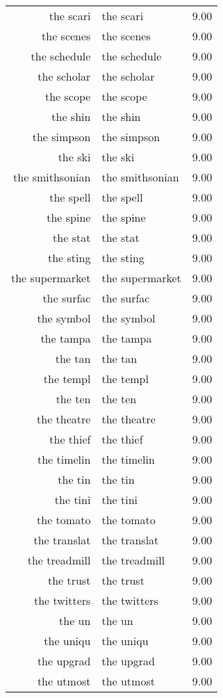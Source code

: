 \begin{table}[ht]
\begin{tabular}{rlr}
  the scari & the scari & 9.00 \\ 
  the scenes & the scenes & 9.00 \\ 
  the schedule & the schedule & 9.00 \\ 
  the scholar & the scholar & 9.00 \\ 
  the scope & the scope & 9.00 \\ 
  the shin & the shin & 9.00 \\ 
  the simpson & the simpson & 9.00 \\ 
  the ski & the ski & 9.00 \\ 
  the smithsonian & the smithsonian & 9.00 \\ 
  the spell & the spell & 9.00 \\ 
  the spine & the spine & 9.00 \\ 
  the stat & the stat & 9.00 \\ 
  the sting & the sting & 9.00 \\ 
  the supermarket & the supermarket & 9.00 \\ 
  the surfac & the surfac & 9.00 \\ 
  the symbol & the symbol & 9.00 \\ 
  the tampa & the tampa & 9.00 \\ 
  the tan & the tan & 9.00 \\ 
  the templ & the templ & 9.00 \\ 
  the ten & the ten & 9.00 \\ 
  the theatre & the theatre & 9.00 \\ 
  the thief & the thief & 9.00 \\ 
  the timelin & the timelin & 9.00 \\ 
  the tin & the tin & 9.00 \\ 
  the tini & the tini & 9.00 \\ 
  the tomato & the tomato & 9.00 \\ 
  the translat & the translat & 9.00 \\ 
  the treadmill & the treadmill & 9.00 \\ 
  the trust & the trust & 9.00 \\ 
  the twitters & the twitters & 9.00 \\ 
  the un & the un & 9.00 \\ 
  the uniqu & the uniqu & 9.00 \\ 
  the upgrad & the upgrad & 9.00 \\ 
  the utmost & the utmost & 9.00 \\ 

\end{tabular}
\end{table}
